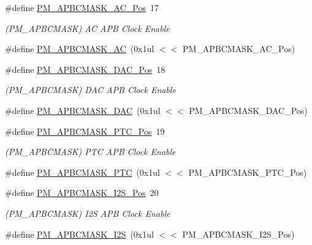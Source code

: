 \begin{DoxyCompactItemize}
\item 
\#define \mbox{\hyperlink{group___s_a_m_d21___p_m_ga6c31231636dfffc0fddb7be68e3ebbc3}{P\+M\+\_\+\+A\+P\+B\+C\+M\+A\+S\+K\+\_\+\+A\+C\+\_\+\+Pos}}~17
\begin{DoxyCompactList}\small\item\em (P\+M\+\_\+\+A\+P\+B\+C\+M\+A\+SK) AC A\+PB Clock Enable \end{DoxyCompactList}\item 
\#define \mbox{\hyperlink{group___s_a_m_d21___p_m_gafc1d7c7553a7dad7147fe63c7b1cf3ff}{P\+M\+\_\+\+A\+P\+B\+C\+M\+A\+S\+K\+\_\+\+AC}}~(0x1ul $<$$<$ P\+M\+\_\+\+A\+P\+B\+C\+M\+A\+S\+K\+\_\+\+A\+C\+\_\+\+Pos)
\item 
\#define \mbox{\hyperlink{group___s_a_m_d21___p_m_ga6b7c892132847d9d6d85da943a09b7f0}{P\+M\+\_\+\+A\+P\+B\+C\+M\+A\+S\+K\+\_\+\+D\+A\+C\+\_\+\+Pos}}~18
\begin{DoxyCompactList}\small\item\em (P\+M\+\_\+\+A\+P\+B\+C\+M\+A\+SK) D\+AC A\+PB Clock Enable \end{DoxyCompactList}\item 
\#define \mbox{\hyperlink{group___s_a_m_d21___p_m_ga290e75eaccf0a50429eb43fdcee8171e}{P\+M\+\_\+\+A\+P\+B\+C\+M\+A\+S\+K\+\_\+\+D\+AC}}~(0x1ul $<$$<$ P\+M\+\_\+\+A\+P\+B\+C\+M\+A\+S\+K\+\_\+\+D\+A\+C\+\_\+\+Pos)
\item 
\#define \mbox{\hyperlink{group___s_a_m_d21___p_m_ga58c6842e80b591c43361601051a75d9b}{P\+M\+\_\+\+A\+P\+B\+C\+M\+A\+S\+K\+\_\+\+P\+T\+C\+\_\+\+Pos}}~19
\begin{DoxyCompactList}\small\item\em (P\+M\+\_\+\+A\+P\+B\+C\+M\+A\+SK) P\+TC A\+PB Clock Enable \end{DoxyCompactList}\item 
\#define \mbox{\hyperlink{group___s_a_m_d21___p_m_ga3e93d2af2629c9c06f24848b2d6c2a74}{P\+M\+\_\+\+A\+P\+B\+C\+M\+A\+S\+K\+\_\+\+P\+TC}}~(0x1ul $<$$<$ P\+M\+\_\+\+A\+P\+B\+C\+M\+A\+S\+K\+\_\+\+P\+T\+C\+\_\+\+Pos)
\item 
\#define \mbox{\hyperlink{group___s_a_m_d21___p_m_ga97bdda5b0ad43f007bf720899e835af0}{P\+M\+\_\+\+A\+P\+B\+C\+M\+A\+S\+K\+\_\+\+I2\+S\+\_\+\+Pos}}~20
\begin{DoxyCompactList}\small\item\em (P\+M\+\_\+\+A\+P\+B\+C\+M\+A\+SK) I2S A\+PB Clock Enable \end{DoxyCompactList}\item 
\#define \mbox{\hyperlink{group___s_a_m_d21___p_m_ga38ff413a1d9951ee7cfc1fd8043ba4e8}{P\+M\+\_\+\+A\+P\+B\+C\+M\+A\+S\+K\+\_\+\+I2S}}~(0x1ul $<$$<$ P\+M\+\_\+\+A\+P\+B\+C\+M\+A\+S\+K\+\_\+\+I2\+S\+\_\+\+Pos)

\end{DoxyCompactItemize}
